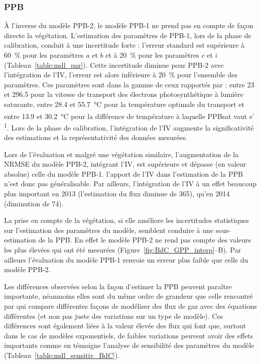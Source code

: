 \subsubsection{PPB}


À l'inverse du modèle PPB-2, le modèle PPB-1 ne prend pas en compte de façon directe la végétation.
L'estimation des paramètres de PPB-1, lors de la phase de calibration, conduit à une incertitude forte : l'erreur standard est supérieure à \SI{60}{\percent} pour les paramètres $a$ et $b$ et à \SI{20}{\percent} pour les paramètres $c$ et $i$ (Tableau~\ref{table:mdl_par}).
Cette incertitude diminue pour PPB-2 avec l'intégration de l'IV, l'erreur est alors inférieure à \SI{20}{\percent} pour l'ensemble des paramètres.
Ces paramètres sont dans la gamme de ceux rapportés par \citet{june2004} : entre \num{23} et \SI{296.5}{\umle} pour la vitesse de transport des électrons photosynthétique à lumière saturante, entre \num{28.4} et \SI{55.7}{\degreeCelsius} pour la température optimale du transport et entre \num{13.9} et \SI{30.2}{\degreeCelsius} pour la différence de température à laquelle PPBsat vaut e\textsuperscript{-1}.
Lors de la phase de calibration, l'intégration de l'IV augmente la significativité des estimations et la représentativité des données mesurées.

Lors de l'évaluation et malgré une végétation similaire, l'augmentation de la NRMSE du modèle PPB-2, intégrant l'IV, est supérieure et dépasse (en valeur absolue) celle du modèle PPB-1. l'apport de l'IV dans l'estimation de la PPB n'est donc pas généralisable.
Par ailleurs, l'intégration de l'IV à un effet beaucoup plus important en 2013 (l'estimation du flux diminue de \SI{365}{\gcma}), qu'en 2014 (diminution de \SI{74}{\gcma}).

La prise en compte de la végétation, si elle améliore les incertitudes statistiques sur l'estimation des paramètres du modèle, semblent conduire à une sous-estimation de la PPB.
En effet le modèle PPB-2 ne rend pas compte des valeurs les plus élevées qui ont été mesurées (Figure~\ref{fig:BdC_GPP_interp}--B).
Par ailleurs l'évaluation du modèle PPB-1 renvoie un erreur plus faible que celle du modèle PPB-2.

%

Les différences observées selon la façon d'estimer la PPB peuvent paraître importante, néanmoins elles sont du même ordre de grandeur que celle rencontré par \citet{worrall2009} qui compare différentes façons de modéliser des flux de gaz avec des équations différentes (et non pas juste des variations sur un type de modèle).
Ces différences sont également liées à la valeur élevée des flux qui font que, surtout dans le cas de modèles exponentiels, de faibles variations peuvent avoir des effets importants comme en témoigne l'analyse de sensibilité des paramètres du modèle (Tableau~\ref{table:mdl_sensitiv_BdC}).

